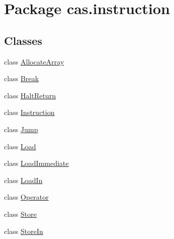 \hypertarget{namespacecas_1_1instruction}{\section{Package cas.\-instruction}
\label{namespacecas_1_1instruction}
}
\subsection*{Classes}
\begin{DoxyCompactItemize}
\item 
class \hyperlink{classcas_1_1instruction_1_1_allocate_array}{Allocate\-Array}
\item 
class \hyperlink{classcas_1_1instruction_1_1_break}{Break}
\item 
class \hyperlink{classcas_1_1instruction_1_1_halt_return}{Halt\-Return}
\item 
class \hyperlink{classcas_1_1instruction_1_1_instruction}{Instruction}
\item 
class \hyperlink{classcas_1_1instruction_1_1_jump}{Jump}
\item 
class \hyperlink{classcas_1_1instruction_1_1_load}{Load}
\item 
class \hyperlink{classcas_1_1instruction_1_1_load_immediate}{Load\-Immediate}
\item 
class \hyperlink{classcas_1_1instruction_1_1_load_in}{Load\-In}
\item 
class \hyperlink{classcas_1_1instruction_1_1_operator}{Operator}
\item 
class \hyperlink{classcas_1_1instruction_1_1_store}{Store}
\item 
class \hyperlink{classcas_1_1instruction_1_1_store_in}{Store\-In}
\end{DoxyCompactItemize}
